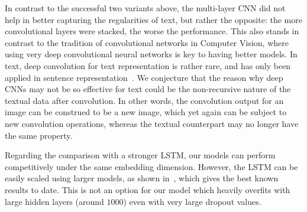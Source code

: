 In contrast to the successful two variants above, the multi-layer CNN
did not help in better capturing the regularities of text, but rather the opposite:
the more convolutional layers were stacked,
the worse the performance. This also stands in contrast to the
tradition of convolutional networks in Computer Vision, where using
very deep convolutional neural networks is key to having better
models. In text, deep convolution for text representation is rather
rare, and has only been applied in sentence
representation~\cite{Kalchbrenner2014conv}. We conjecture that the
reason why deep CNNs may not be so effective for text could be the
non-recursive nature of the textual data after convolution. In other
words, the convolution output for an image can be construed to be a new
image, which yet again can be subject to new convolution operations,
whereas the textual counterpart may no longer have the same
property. 


Regarding the comparison with a stronger LSTM, our models can perform competitively under the same embedding
dimension. However, the LSTM can be easily scaled using larger models,
as shown in~, which gives the best
known results to date. This is not an option for our model which heavily overfits with large 
hidden layers (around $1000$) even with very large dropout values. 




